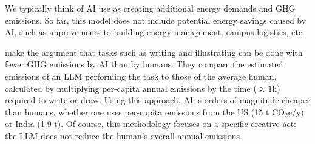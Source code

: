 \documentclass[11pt]{article}
\begin{document}
We typically think of AI use as creating additional energy demands and GHG emissions.
So far, this model does not include potential energy savings caused by AI, such as improvements
to building energy management, campus logistics, etc.

\textcite{tomlinson2024carbon} make the argument that tasks such as writing
and illustrating can be done with fewer GHG emissions by AI than by humans. They compare the
estimated emissions of an LLM performing the task to those of the average human, calculated
by multiplying per-capita annual emissions by the time ($\approx 1$h) required to write or draw.
Using this approach, AI is orders of magnitude cheaper than humans, whether one uses per-capita
emissions from the US (15 t CO$_2$e/y) or India (1.9 t). Of course, this methodology focuses on
a specific creative act: the LLM does not reduce the human's overall annual emissions.

\printbibliography
\end{document}
